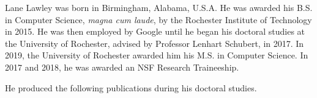 \begin{curriculumvitae}


Lane Lawley was born in Birmingham, Alabama, U.S.A. He was awarded his B.S. in Computer Science, \textit{magna cum laude}, by the Rochester Institute of Technology in 2015. He was then employed by Google until he began his doctoral studies at the University of Rochester, advised by Professor Lenhart Schubert, in 2017. In 2019, the University of Rochester awarded him his M.S. in Computer Science. In 2017 and 2018, he was awarded an NSF Research Traineeship.



He produced the following publications during his doctoral studies.


\end{curriculumvitae}
